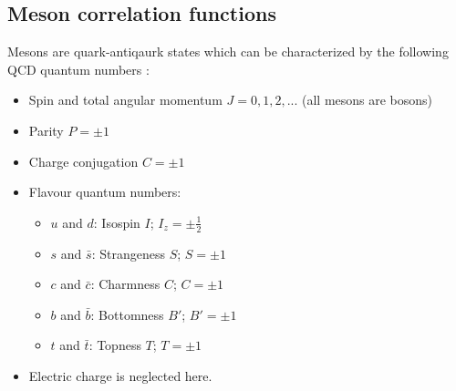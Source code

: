\subsection{Meson correlation functions}
    Mesons are quark-antiqaurk states which can be characterized by the following QCD quantum numbers \cite{introduction_to_lattice_hadron_spectroscopy}:
    \begin{itemize}
        \item Spin and total angular momentum $J = 0, 1, 2,...$ (all mesons are bosons)
        \item Parity $P = \pm1$
        \item Charge conjugation $C = \pm1$
        \item Flavour quantum numbers:
            \begin{itemize}
                \item $u$ and $d$: Isospin $I$; $I_z = \pm\frac{1}{2}$
                \item $s$ and $\bar{s}$: Strangeness $S$; $S = \pm 1$
                \item $c$ and $\bar{c}$: Charmness $C$; $C = \pm 1$
                \item $b$ and $\bar{b}$: Bottomness $B'$; $B' = \pm 1$
                \item $t$ and $\bar{t}$: Topness $T$; $T = \pm 1$
            \end{itemize}
        \item Electric charge is neglected here.
    \end{itemize}
    
